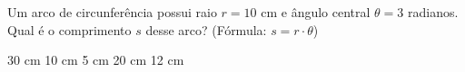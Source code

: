Um arco de circunferência possui raio $r = 10$ cm e ângulo central $\theta = 3$ radianos. Qual é o comprimento $s$ desse arco? (Fórmula: $s = r \cdot \theta$)

\parbox{\linewidth}{

30 cm
10 cm
5 cm
20 cm
12 cm

}


